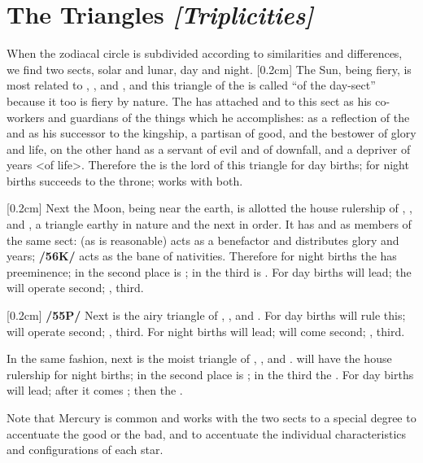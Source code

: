 \section{The Triangles \textit{[Triplicities]}}

When the zodiacal circle is subdivided according to similarities and differences, we find two sects, solar and lunar, day and night. 
[0.2cm]
The Sun, being fiery, is most related to \Aries, \Leo, and \Sagittarius, and this triangle of the \Sun\xspace is called “of the day-sect” because it too is fiery by nature. The \Sun\xspace has attached \Jupiter\xspace and \Saturn\xspace to this sect as his co-workers and guardians of the things which he accomplishes: \Jupiter\xspace as a reflection of the \Sun\xspace and as his successor to the kingship, a partisan of good, and the bestower of glory
and life, \Saturn\xspace on the other hand as a servant of evil and of downfall, and a depriver of years <of life>. Therefore the \Sun\xspace is the lord of this triangle for day births; for night births \Jupiter\xspace succeeds to the throne; \Saturn\xspace works with both.

[0.2cm]
Next the Moon, being near the earth, is allotted the house rulership of \Taurus, \Virgo, and \Capricorn, a triangle earthy in nature and the next in order. It has \Venus\xspace and \Mars\xspace as members of the same sect: \Venus\xspace
(as is reasonable) acts as a benefactor and distributes glory and years; \textbf{/56K/} \Mars\xspace acts as the bane of
nativities. Therefore for night births the \Moon\xspace has preeminence; in the second place is \Venus; in the third
is \Mars. For day births \Venus\xspace will lead; the \Moon\xspace will operate second; \Mars, third.

[0.2cm]
\textbf{/55P/} Next is the airy triangle of \Gemini, \Libra, and \Aquarius. For day births \Saturn\xspace will rule this;
\Mercury\xspace will operate second; \Jupiter, third. For night births \Mercury\xspace will lead; \Saturn\xspace will come second; \Jupiter, third.

In the same fashion, next is the moist triangle of \Cancer, \Scorpio, and \Pisces. \Mars\xspace will have the house rulership for night births; in the second place is \Venus; in the third the \Moon. For day births \Venus\xspace will lead; after it comes \Mars; then the \Moon. 

\mndl[0.2cm]
Note that Mercury is common and works with the two sects to a special degree to accentuate the good or the bad, and to accentuate the individual characteristics and configurations of each star.

\newpage